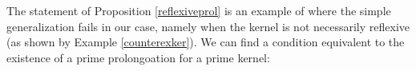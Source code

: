 The statement of Proposition \ref{reflexiveprol} is an example of where the simple generalization fails in our case, namely when the kernel is not necessarily reflexive (as shown by Example \ref{counterexker}). We can find a condition equivalent to the existence of a prime prolongoation for a prime kernel:


